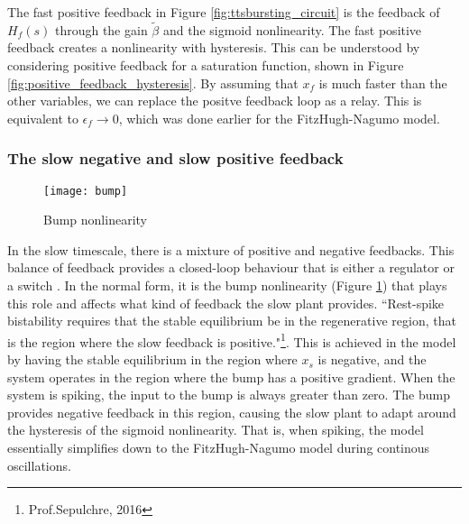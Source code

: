 \documentclass[a4paper, 12pt]{article}
\begin{document}
The fast positive feedback in Figure \ref{fig:ttsbursting_circuit} is the feedback of $H_f(s)$ through the gain $\tilde{\beta}$ and the sigmoid nonlinearity. The fast positive feedback creates a nonlinearity with hysteresis. This can be understood by considering positive feedback for a saturation function, shown in Figure \ref{fig:positive_feedback_hysteresis}. By assuming that $x_f$ is much faster than the other variables, we can replace the positve feedback loop as a relay. This is equivalent to $\epsilon_f\rightarrow 0$, which was done earlier for the FitzHugh-Nagumo model. 

\subsubsection{The slow negative and slow positive feedback}
\begin{figure}[h!]
\texttt{[image: bump]}
\caption{Bump nonlinearity}
\label{fig:bump_nonlinearity}
\end{figure}
In the slow timescale, there is a mixture of positive and negative feedbacks. This balance of feedback provides a closed-loop behaviour that is either a regulator or a switch \cite{drion}. In the normal form, it is the bump nonlinearity (Figure \ref{fig:bump_nonlinearity}) that plays this role and affects what kind of feedback the slow plant provides. ``Rest-spike bistability requires that the stable equilibrium be in the regenerative region, that is the region where the slow feedback is positive."\footnote{Prof.Sepulchre, 2016}. This is achieved in the model by having the stable equilibrium in the region where $x_s$ is negative, and the system operates in the region where the bump has a positive gradient. When the system is spiking, the input to the bump is always greater than zero. The bump provides negative feedback in this region, causing the slow plant to adapt around the hysteresis of the sigmoid nonlinearity. That is, when spiking, the model essentially simplifies down to the FitzHugh-Nagumo model during continous oscillations. 
\end{document}
